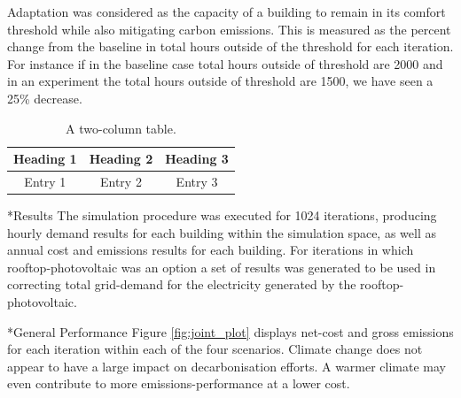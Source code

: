 \documentclass[twocolumn, a4paper,10pt]{article}
\makeatletter
\renewcommand\section{\@startsection{section}{1}{\z@}{3pt}{3pt}{\normalfont\large\bfseries}}
\renewcommand\subsection{\@startsection{subsection}{1}{\z@}{\z@}{\z@}{\normalfont\normalsize\bfseries}}
\renewcommand\subsection{\@startsection{subsection}{1}{\z@}{\z@}{0.1pt}{\normalfont\normalsize\bfseries}}
\makeatother
\begin{document}
Adaptation was considered as the capacity of a building to remain in its comfort threshold while also mitigating carbon emissions. This is measured as the percent change from the baseline in total hours outside of the threshold for each iteration. For instance if in the baseline case total hours outside of threshold are 2000 and in an experiment the total hours outside of threshold are 1500, we have seen a 25\% decrease. 

\begin{table}[h]
    \vspace{-5pt}   %
    \caption{A two-column table.}
    \label{tab:model_table}
    \centering
    \begin{tabular}{| c | c | c | }
        \hline
        \bf{Heading 1} & \bf{Heading} 2 & \bf{Heading 3} \\
        \hline
        Entry 1 & Entry 2 & Entry 3 \\
        \hline
    \end{tabular}
    \vspace{-5pt}   %
\end{table}


\section*{Results}
The simulation procedure was executed for 1024 iterations, producing hourly demand results for each building within the simulation space, as well as annual cost and emissions results for each building. For iterations in which rooftop-photovoltaic was an option a set of results was generated to be used in correcting total grid-demand for the electricity generated by the rooftop-photovoltaic.  


\subsection*{General Performance}
Figure \ref{fig:joint_plot} displays net-cost and gross emissions for each iteration within each of the four scenarios. Climate change does not appear to have a large impact on decarbonisation efforts. A warmer climate may even contribute to more emissions-performance at a lower cost. 
\end{document}
